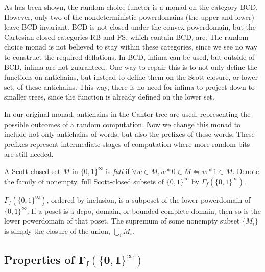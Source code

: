 
As has been shown, the random choice functor is a monad on the category \textsf{BCD}.  However, only two of the nondeterministic powerdomains (the upper and lower) leave \textsf{BCD} invariant.  \textsf{BCD} is not closed under the convex powerdomain, but the Cartesian closed categories \textsf{RB} and \textsf{FS}, which contain \textsf{BCD}, are.  The random choice monad is not believed to stay within these categories, since we see no way to construct the required deflations.  In \textsf{BCD}, infima can be used, but outside of \textsf{BCD}, infima are not guaranteed.  One way to repair this is to not only define the functions on antichains, but instead to define them on the Scott closure, or lower set, of these antichains.  This way, there is no need for infima to project down to smaller trees, since the function is already defined on the lower set. 

In our original monad, antichains in the Cantor tree are used, representing the possible outcomes of a random computation.  Now we change this monad to include not only antichains of words, but also the prefixes of these words.  These prefixes represent intermediate stages of computation where more random bits are still needed.

\begin{definition}
A Scott-closed set $M$ in $\{0,1\}^\infty$ is \emph{full} if $\forall w\in M, w*0 \in M \Leftrightarrow w*1 \in M$.  Denote the family of nonempty, full Scott-closed subsets of $\{0,1\}^\infty$ by $\Gamma_{f}(\{0,1\}^\infty)$.
\end{definition}

$\Gamma_f(\{0,1\}^\infty)$, ordered by inclusion, is a subposet of the lower powerdomain of $\{0,1\}^\infty$.  If a poset is a dcpo, domain, or bounded complete domain, then so is the lower powerdomain of that poset.  The supremum of some nonempty subset $\{M_i\}$ is simply the closure of the union, $\overline{\bigcup_i M_i}$.

\subsection[Properties of $\Gamma_{f}(\{0,1\}^\infty)$]{Properties of $\boldsymbol{\Gamma_{f}(\{0,1\}^\infty)}$}

